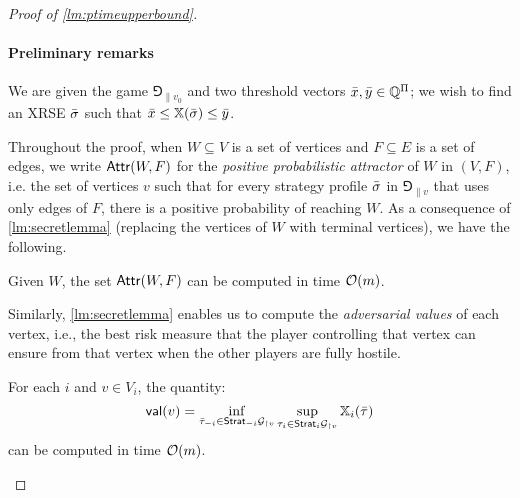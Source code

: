 \begin{proof}[Proof of \cref{lm:ptimeupperbound}] \paragraph*{Preliminary remarks}

We are given the game $\Game_{\|v_0}$ and two threshold vectors ${\bar{x}}, {\bar{y}} \in \mathbb{Q}^{\Pi}$; we wish to find an XRSE ${\bar{\sigma}}$ such that ${\bar{x}} \leq \mathbb{X}({\bar{\sigma}}) \leq {\bar{y}}$. 

    Throughout the proof, when $W \subseteq V$ is a set of vertices and $F \subseteq E$ is a set of edges, we write $\mathsf{Attr}(W, F)$ for the \emph{positive probabilistic attractor} of $W$ in $(V, F)$, i.e. the set of vertices $v$ such that for every strategy profile ${\bar{\sigma}}$ in $\Game_{\|v}$ that uses only edges of $F$, there is a positive probability of reaching $W$.
    As a consequence of \cref{lm:secretlemma} (replacing the vertices of $W$ with terminal vertices), we have the following.
    
    \begin{claim}\label{claim:positiveattractorLinear}
      Given $W$, the set $\mathsf{Attr}(W, F)$ can be computed in time $\mathcal{O}(m)$.
    \end{claim}


Similarly, \cref{lm:secretlemma} enables us to compute the \emph{adversarial values} of each vertex, i.e., the best risk measure that the player controlling that vertex can ensure from that vertex when the other players are fully hostile.

    \begin{claim}\label{claim:adverserialXRLinear}
        For each $i$ and $v \in V_i$, the quantity:
        $$\mathsf{val}(v) = \inf_{{\bar{\tau}}_{-i} \in \mathsf{Strat}_{-i}\mathcal{G}_{\upharpoonright v}} \sup_{\tau_i \in \mathsf{Strat}_i\mathcal{G}_{\upharpoonright v}} \mathbb{X}_i({\bar{\tau}})$$
        can be computed in time $\mathcal{O}(m)$. 
    \end{claim}


\end{proof}
